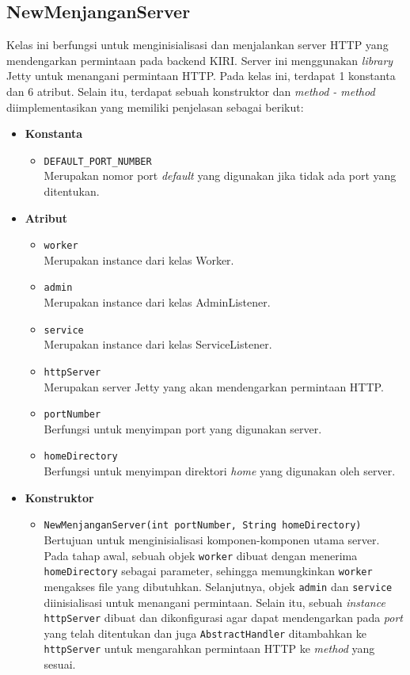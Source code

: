 \subsection{NewMenjanganServer}
Kelas ini berfungsi untuk menginisialisasi dan menjalankan server HTTP yang mendengarkan permintaan pada backend KIRI. Server ini menggunakan \textit{library} Jetty untuk menangani permintaan HTTP. Pada kelas ini, terdapat 1 konstanta dan 6 atribut. Selain itu, terdapat sebuah konstruktor dan \textit{method - method} diimplementasikan yang memiliki penjelasan sebagai berikut:
\begin{itemize}
    \item \textbf{Konstanta}
    \begin{itemize}
        \item \texttt{DEFAULT\_PORT\_NUMBER}
        \\ Merupakan nomor port \textit{default} yang digunakan jika tidak ada port yang ditentukan.
    \end{itemize}

    \item \textbf{Atribut}
    \begin{itemize}
        \item \texttt{worker}
        \\ Merupakan instance dari kelas Worker.
        \item \texttt{admin}
        \\ Merupakan instance dari kelas AdminListener.
        \item \texttt{service}
        \\ Merupakan instance dari kelas ServiceListener.
        \item \texttt{httpServer}
        \\ Merupakan server Jetty yang akan mendengarkan permintaan HTTP.
        \item \texttt{portNumber}
        \\ Berfungsi untuk menyimpan port yang digunakan server.
        \item \texttt{homeDirectory}
        \\ Berfungsi untuk menyimpan direktori \textit{home} yang digunakan oleh server. 
    \end{itemize}
    \newpage
    \item \textbf{Konstruktor}
    \begin{itemize}
        \item \texttt{NewMenjanganServer(int portNumber, String homeDirectory)}
        \\ Bertujuan untuk menginisialisasi komponen-komponen utama server. Pada tahap awal, sebuah objek \texttt{worker} dibuat dengan menerima \texttt{homeDirectory} sebagai parameter, sehingga memungkinkan \texttt{worker} mengakses file yang dibutuhkan. Selanjutnya, objek \texttt{admin} dan \texttt{service} diinisialisasi untuk menangani permintaan. Selain itu, sebuah \textit{instance} \texttt{httpServer} dibuat dan dikonfigurasi agar dapat mendengarkan pada \textit{port} yang telah ditentukan dan juga \texttt{AbstractHandler} ditambahkan ke \texttt{httpServer} untuk mengarahkan permintaan HTTP ke \textit{method} yang sesuai.
    \end{itemize}


\end{itemize}

